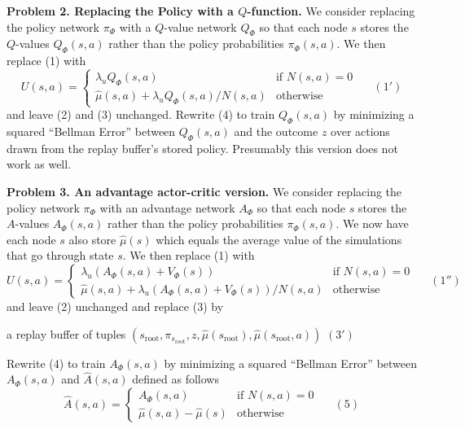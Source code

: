 \documentclass{article}
\newcommand{\solution}[1]{}
\begin{document}
\bigskip
{\bf Problem 2.  Replacing the Policy with a $Q$-function.}
We consider replacing the policy network $\pi_\Phi$ with a $Q$-value network $Q_\Phi$ so that each node $s$ stores the $Q$-values $Q_\Phi(s,a)$ rather than
the policy probabilities $\pi_\Phi(s,a)$.  We then replace (1) with
$$U(s,a) =  \left\{\begin{array}{ll}\lambda_u Q_\Phi(s,a) &\mbox{if $N(s,a) = 0$} \\ \hat{\mu}(s,a) + \lambda_u Q_\Phi(s,a)/N(s,a) & \mbox{otherwise} \end{array}\right.\;\;\;\;\;(1')$$
and leave (2) and (3) unchanged.  Rewrite (4) to train $Q_\Phi(s,a)$ by minimizing a squared ``Bellman Error'' between $Q_\Phi(s,a)$ and the outcome $z$ over actions drawn from the replay buffer's stored policy.
Presumably this version does not work as well.

\solution{
  
  $$\Phi^*\; = \;\argmin_\Phi \;E_{(s,\pi,z) \sim \mathrm{Replay},\;a \sim \pi}\;
  \left(\begin{array}{l} (V_\Phi(s) - z)^2 \\ \\ - \lambda_1(Q(s,a) - z)^2 \\ \\ + \lambda_2||\Phi||^2\end{array}\right)$$
}

\bigskip
{\bf Problem 3. An advantage actor-critic version.}
We consider replacing the policy network $\pi_\Phi$ with an advantage network $A_\Phi$ so that each node $s$ stores the $A$-values $A_\Phi(s,a)$ rather than
the policy probabilities $\pi_\Phi(s,a)$.  We now have each node $s$ also store $\hat{\mu}(s)$ which equals the average value of the simulations that go through state $s$.
We then replace (1) with
$$U(s,a) =  \left\{\begin{array}{ll}\lambda_u(A_\Phi(s,a) + V_\Phi(s)) &\mbox{if $N(s,a) = 0$} \\ \hat{\mu}(s,a) + \lambda_u(A_\Phi(s,a) + V_\Phi(s))/N(s,a) & \mbox{otherwise} \end{array}\right.\;\;\;\;\;(1'')$$
and leave (2) unchanged and replace (3) by

\medskip
\centerline{a replay buffer of tuples $(s_{\mathrm{root}},\pi_{s_{\mathrm{root}}},z,\hat{\mu}(s_{\mathrm{root}}),\hat{\mu}(s_{\mathrm{root}},a))$ \hspace{2em}$(3')$}

\medskip
Rewrite (4) to train $A_\Phi(s,a)$ by minimizing a squared ``Bellman Error'' between $A_\Phi(s,a)$ and $\hat{A}(s,a)$ defined as follows
$$\hat{A}(s,a) =  \left\{\begin{array}{ll}A_\Phi(s,a) &\mbox{if $N(s,a) = 0$} \\ \hat{\mu}(s,a) - \hat{\mu}(s) & \mbox{otherwise} \end{array}\right.\;\;\;\;\;(5)$$
\end{document}
